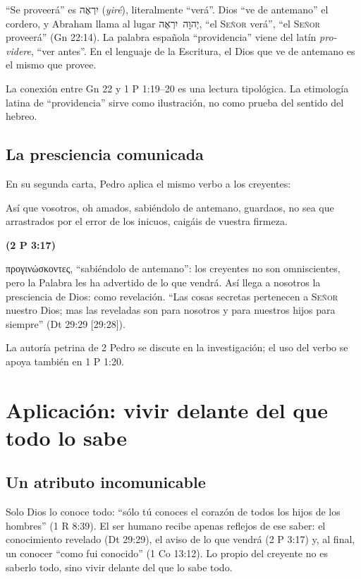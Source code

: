 \documentclass[11pt,letterpaper]{article}
\newcommand{\heb}[1]{\mbox{\foreignlanguage{hebrew}{#1}}}
\newcommand{\grc}[1]{\foreignlanguage{ancientgreek}{#1}}
\newcommand{\SENOR}{\textsc{Señor}}
\newcommand{\fuente}[1]{\par\hfill{\upshape\bfseries\small\textcolor{azul}{#1}}}
\begin{document}
``Se proveerá'' es \heb{יִרְאֶה} (\emph{yiré}), literalmente ``verá''. Dios ``ve de antemano'' el cordero, y Abraham llama al lugar \heb{יְהוָה יִרְאֶה}, ``el \SENOR{} verá'', ``el \SENOR{} proveerá'' (Gn 22:14). La palabra española ``providencia'' viene del latín \emph{pro-videre}, ``ver antes''. En el lenguaje de la Escritura, el Dios que ve de antemano es el mismo que provee.

\begin{nota}[Precisión]
La conexión entre Gn 22 y 1 P 1:19--20 es una lectura tipológica. La etimología latina de ``providencia'' sirve como ilustración, no como prueba del sentido del hebreo.
\end{nota}

\subsection{La presciencia comunicada}
En su segunda carta, Pedro aplica el mismo verbo a los creyentes:

\begin{cita}Así que vosotros, oh amados, sabiéndolo de antemano, guardaos, no sea que arrastrados por el error de los inicuos, caigáis de vuestra firmeza.\fuente{(2 P 3:17)}\end{cita}

\grc{προγινώσκοντες}, ``sabiéndolo de antemano'': los creyentes no son omniscientes, pero la Palabra les ha advertido de lo que vendrá. Así llega a nosotros la presciencia de Dios: como revelación. ``Las cosas secretas pertenecen a \SENOR{} nuestro Dios; mas las reveladas son para nosotros y para nuestros hijos para siempre'' (Dt 29:29 [29:28]).

\begin{nota}[Precisión]
La autoría petrina de 2 Pedro se discute en la investigación; el uso del verbo se apoya también en 1 P 1:20.
\end{nota}

\section{Aplicación: vivir delante del que todo lo sabe}

\subsection{Un atributo incomunicable}
Solo Dios lo conoce todo: ``sólo tú conoces el corazón de todos los hijos de los hombres'' (1 R 8:39). El ser humano recibe apenas reflejos de ese saber: el conocimiento revelado (Dt 29:29), el aviso de lo que vendrá (2 P 3:17) y, al final, un conocer ``como fui conocido'' (1 Co 13:12). Lo propio del creyente no es saberlo todo, sino vivir delante del que lo sabe todo.
\end{document}
